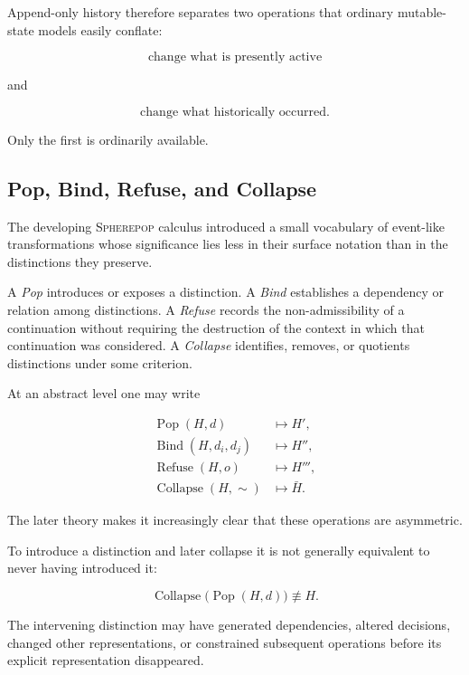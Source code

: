 \documentclass[11pt]{article}
\theoremstyle{remark}
\newcommand{\Spherepop}{\textsc{Spherepop}}
\begin{document}
Append-only history therefore separates two operations that ordinary mutable-state models easily conflate:

\begin{equation}
\text{change what is presently active}
\end{equation}

and

\begin{equation}
\text{change what historically occurred}.
\end{equation}

Only the first is ordinarily available.

\subsection{Pop, Bind, Refuse, and Collapse}

The developing \Spherepop{} calculus introduced a small vocabulary of event-like transformations whose significance lies less in their surface notation than in the distinctions they preserve.

A \emph{Pop} introduces or exposes a distinction. A \emph{Bind} establishes a dependency or relation among distinctions. A \emph{Refuse} records the non-admissibility of a continuation without requiring the destruction of the context in which that continuation was considered. A \emph{Collapse} identifies, removes, or quotients distinctions under some criterion.

At an abstract level one may write

\begin{align}
\operatorname{Pop}(H,d)
    &\mapsto H',\\
\operatorname{Bind}(H,d_i,d_j)
    &\mapsto H'',\\
\operatorname{Refuse}(H,o)
    &\mapsto H''',\\
\operatorname{Collapse}(H,\sim)
    &\mapsto \bar{H}.
\end{align}

The later theory makes it increasingly clear that these operations are asymmetric.

To introduce a distinction and later collapse it is not generally equivalent to never having introduced it:

\begin{equation}
\operatorname{Collapse}
\bigl(
\operatorname{Pop}(H,d)
\bigr)
\not\equiv
H.
\end{equation}

The intervening distinction may have generated dependencies, altered decisions, changed other representations, or constrained subsequent operations before its explicit representation disappeared.
\end{document}

